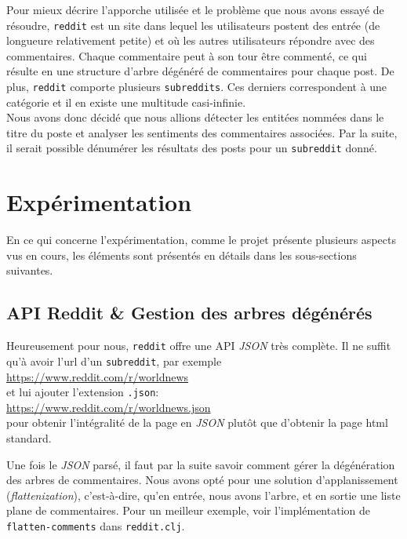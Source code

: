 \documentclass[12pt]{article}
\begin{document}
Pour mieux décrire l'apporche utilisée et le problème que nous avons essayé de résoudre, \verb;reddit; est un site dans lequel les utilisateurs postent des entrée (de longueure relativement petite) et où les autres utilisateurs répondre avec des commentaires. Chaque commentaire peut à son tour être commenté, ce qui résulte en une structure d'arbre dégénéré de commentaires pour chaque post. De plus, \verb;reddit; comporte plusieurs \verb;subreddits;. Ces derniers correspondent à une catégorie et il en existe une multitude casi-infinie.\\

Nous avons donc décidé que nous allions détecter les entitées nommées dans le titre du poste et analyser les sentiments des commentaires associées. Par la suite, il serait possible dénumérer les résultats des posts pour un \verb;subreddit; donné.

\section{Expérimentation}

En ce qui concerne l'expérimentation, comme le projet présente plusieurs aspects vus en cours, les éléments sont présentés en détails dans les sous-sections suivantes.

\subsection{API Reddit \& Gestion des arbres dégénérés}
\label{sec:api-reddit}

Heureusement pour nous, \verb;reddit; offre une API \textit{JSON} très complète. Il ne suffit qu'à avoir l'url d'un \verb;subreddit;, par exemple\\

\url{https://www.reddit.com/r/worldnews}\\

et lui ajouter l'extension \verb;.json;:\\

\url{https://www.reddit.com/r/worldnews.json}\\

pour obtenir l'intégralité de la page en \textit{JSON} plutôt que d'obtenir la page html standard.

Une fois le \textit{JSON} parsé, il faut par la suite savoir comment gérer la dégénération des arbres de commentaires. Nous avons opté pour une solution d'applanissement (\textit{flattenization}), c'est-à-dire, qu'en entrée, nous avons l'arbre, et en sortie une liste plane de commentaires. Pour un meilleur exemple, voir l'implémentation de \verb;flatten-comments; dans \verb;reddit.clj;.
\end{document}
